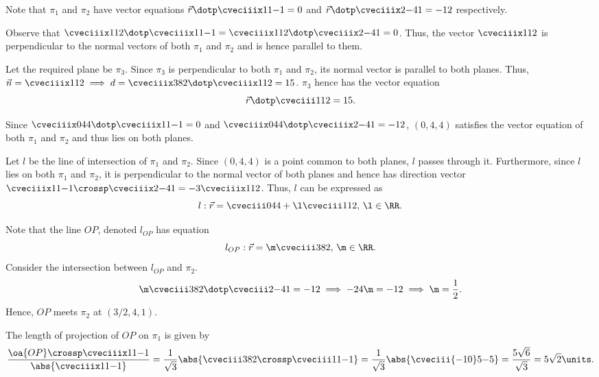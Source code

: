 \begin{solution}
    Note that $\pi_1$ and $\pi_2$ have vector equations $\vec r \dotp \cveciiix11{-1} = 0$ and $\vec r \dotp \cveciiix2{-4}1 = -12$ respectively.

    \begin{ppart}
        Observe that $\cveciiix112 \dotp \cveciiix11{-1} = \cveciiix112 \dotp \cveciiix2{-4}1 = 0$. Thus, the vector $\cveciiix112$ is perpendicular to the normal vectors of both $\pi_1$ and $\pi_2$ and is hence parallel to them.
    \end{ppart}
    \begin{ppart}
        Let the required plane be $\pi_3$. Since $\pi_3$ is perpendicular to both $\pi_1$ and $\pi_2$, its normal vector is parallel to both planes. Thus, $\vec n = \cveciiix112 \implies d = \cveciiix382 \dotp  \cveciiix112 = 15$. $\pi_3$ hence has the vector equation \[\vec r \dotp \cveciii112 = 15.\]
    \end{ppart}
    \begin{ppart}
        Since $\cveciiix044 \dotp \cveciiix11{-1} = 0$ and $\cveciiix044 \dotp \cveciiix2{-4}1 = -12$, $(0, 4, 4)$ satisfies the vector equation of both $\pi_1$ and $\pi_2$ and thus lies on both planes.

        Let $l$ be the line of intersection of $\pi_1$ and $\pi_2$. Since $(0, 4, 4)$ is a point common to both planes, $l$ passes through it. Furthermore, since $l$ lies on both $\pi_1$ and $\pi_2$, it is perpendicular to the normal vector of both planes and hence has direction vector $\cveciiix11{-1} \crossp \cveciiix2{-4}1 = -3\cveciiix112$. Thus, $l$ can be expressed as \[l : \vec r = \cveciii044 + \l\cveciii112, \, \l \in \RR.\]
    \end{ppart}
    \begin{ppart}
        Note that the line $OP$, denoted $l_{OP}$ has equation \[l_{OP} : \vec r = \m \cveciii382, \, \m \in \RR.\] Consider the intersection between $l_{OP}$ and $\pi_2$. \[\m\cveciii382 \dotp \cveciii2{-4}1 = -12 \implies -24\m = -12 \implies \m = \frac12.\] Hence, $OP$ meets $\pi_2$ at $(3/2, 4, 1)$.
    \end{ppart}
    \begin{ppart}
        The length of projection of $OP$ on $\pi_1$ is given by \[\frac{\oa{OP} \crossp \cveciiix11{-1}}{\abs{\cveciiix11{-1}}} = \frac1{\sqrt{3}} \abs{\cveciii382 \crossp \cveciii11{-1}} = \frac1{\sqrt3} \abs{\cveciii{-10}5{-5}} = \frac{5\sqrt{6}}{\sqrt3} = 5\sqrt{2} \units.\]
    \end{ppart}
\end{solution}

